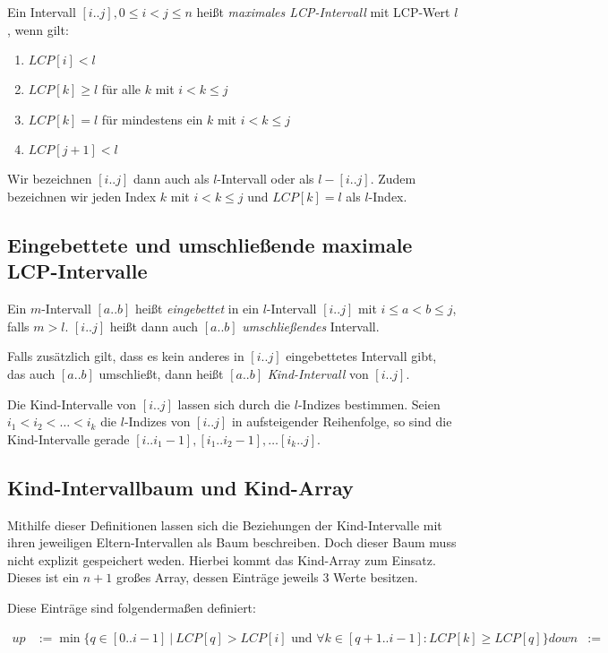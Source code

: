 Ein Intervall $[i..j], 0 \leq i < j \leq n$ heißt \textit{maximales LCP-Intervall} mit LCP-Wert $l$, wenn gilt:

\begin{enumerate}
	\item $LCP[i] < l$
	\item $LCP[k] \geq l$ für alle $k$ mit $i < k \leq j$
	\item $LCP[k] = l$ für mindestens ein $k$ mit $i < k \leq j$
	\item $LCP[j + 1] < l$
\end{enumerate}

Wir bezeichnen $[i..j]$ dann auch als $l$-Intervall oder als $l-[i..j]$. Zudem bezeichnen wir jeden Index $k$ mit $i < k \leq j$ und $LCP[k] = l$ als $l$-Index.

\subsection{Eingebettete und umschließende maximale LCP-Intervalle}

Ein $m$-Intervall $[a..b]$ heißt \textit{eingebettet} in ein $l$-Intervall $[i..j]$ mit $i \leq a < b \leq j$, falls $m > l$. $[i..j]$ heißt dann auch $[a..b]$ \textit{umschließendes} Intervall.

Falls zusätzlich gilt, dass es kein anderes in $[i..j]$ eingebettetes Intervall gibt, das auch $[a..b]$ umschließt, dann heißt $[a..b]$ \textit{Kind-Intervall} von $[i..j]$.

Die Kind-Intervalle von $[i..j]$ lassen sich durch die $l$-Indizes bestimmen. Seien $i_1 < i_2 < \dots < i_k$ die $l$-Indizes von $[i..j]$ in aufsteigender Reihenfolge, so sind die 
Kind-Intervalle gerade $[i.. i_1 - 1], [i_1.. i_2 - 1], \dots [i_k..j]$.

\subsection{Kind-Intervallbaum und Kind-Array}

Mithilfe dieser Definitionen lassen sich die Beziehungen der Kind-Intervalle mit ihren jeweiligen Eltern-Intervallen als Baum beschreiben.
Doch dieser Baum muss nicht explizit gespeichert weden. Hierbei kommt das Kind-Array zum Einsatz. Dieses ist ein $n + 1$ großes Array, dessen Einträge jeweils 3 Werte besitzen.

Diese Einträge sind folgendermaßen definiert:

\begin{align*}
	up &:= \min\{q \in [0..i-1]\ |\ LCP[q] > LCP[i] \text{ und } \forall k \in [q + 1..i - 1] : LCP[k] \geq LCP[q]\} 
	down &:= 
\end{align*}



